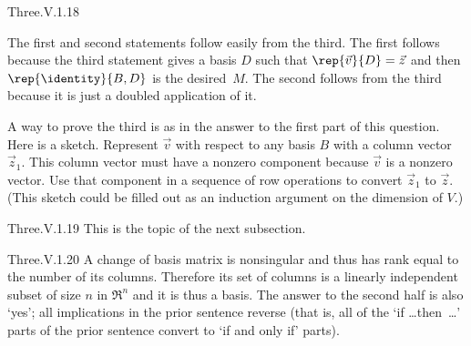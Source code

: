 \begin{ans}{Three.V.1.18}
\begin{exparts}
          The first and second statements follow easily from the third.
          The first follows because the third statement gives a basis $D$
          such that $\rep{\vec{v}}{D}=\vec{z}$ and then
          $\rep{\identity}{B,D}$ is the desired~$M$.
          The second follows from the third because it is just a
          doubled application of it.

          A way to prove the third is as in the answer to the first part
          of this question.
          Here is a sketch.
          Represent $\vec{v}$ with respect to any basis $B$ with a column
          vector $\vec{z}_1$.
          This column vector must have a nonzero component because $\vec{v}$
          is a nonzero vector.
          Use that component in a sequence of row operations to convert
          $\vec{z}_1$ to $\vec{z}$.
          (This sketch could be filled out as an induction
          argument on the dimension of $V$.)
       \end{exparts}
     
\end{ans}
\begin{ans}{Three.V.1.19}
      This is the topic of the next subsection.
    
\end{ans}
\begin{ans}{Three.V.1.20}
      A change of basis matrix is nonsingular and thus
      has rank equal to the number of its columns.
      Therefore its set of columns is a linearly independent subset of size
      $n$ in $\Re^n$ and it is thus a basis.
      The answer to the second half is also `yes'; all implications in the
      prior sentence reverse
      (that is, all of the `if \ldots then~\ldots' parts of the prior sentence
      convert to `if and only if' parts).
    
\end{ans}
